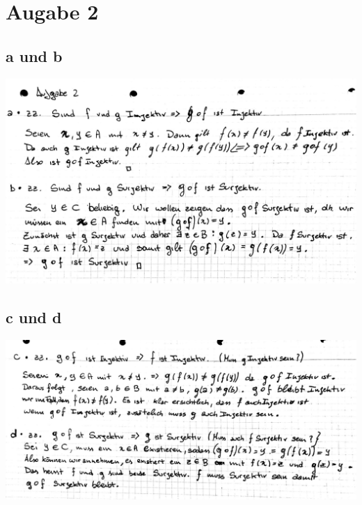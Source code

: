 \documentclass[14pt,a4paper,landscape]{article}
\begin{document}
\section*{Augabe 2}
\subsection*{a und b}
\begin{center}
\includegraphics[scale=0.3]{AB1-2_1.jpg} 
\end{center}
\subsection*{c und d}
\begin{center}
\includegraphics[scale=0.3]{AB1-2_2.jpg} 
\end{center}

\newpage
\end{document}

